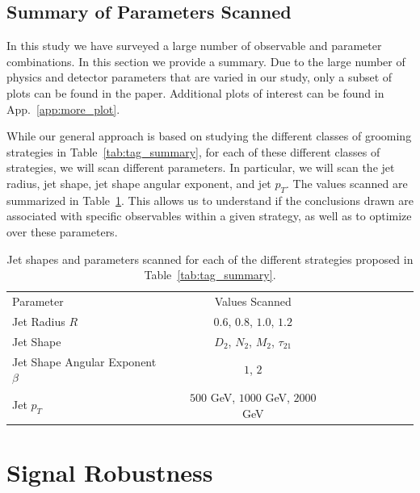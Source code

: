 \documentclass[11pt,letterpaper]{article}
\DeclareRobustCommand{\App}[1]{App.~\ref{#1}}
\DeclareRobustCommand{\Tab}[1]{Table~\ref{#1}}
\begin{document}
\subsection{Summary of Parameters Scanned}\label{sec:params}

In this study we have surveyed a large number of observable and parameter combinations. In this section we provide a summary. Due to the large number of physics and detector parameters that are varied in our study, only a subset of plots can be found in the paper. Additional plots of interest can be found in \App{app:more_plot}.

While our general approach is based on studying the different classes of grooming strategies in \Tab{tab:tag_summary}, for each of these different classes of strategies, we will scan different parameters. In particular, we will scan the jet radius, jet shape, jet shape angular exponent, and jet $p_T$. The values scanned are summarized in \Tab{tab:params}. This allows us to understand if the conclusions drawn are associated with specific observables within a given strategy, as well as to optimize over these parameters.



\begin{table}
\begin{center}
\begin{tabular}{| l | c | c |c |c|c|c |c|r| }
  \hline                       
  Parameter &  Values Scanned \\
  Jet Radius $R$ &   $0.6$, $0.8$, $1.0$, $1.2$  \\
  Jet Shape  &   $D_2$, $N_2$, $M_2$, $\tau_{21}$  \\
  Jet Shape Angular Exponent $\beta$ &   $1$, $2$ \\
  Jet $p_T$ &   $500$ GeV, $1000$ GeV, $2000$ GeV  \\
  \hline  
\end{tabular}
\end{center}
\caption{
Jet shapes and parameters scanned for each of the different strategies proposed in \Tab{tab:tag_summary}.
}
\label{tab:params}
\end{table}


\section{Signal Robustness}\label{sec:polar}
\end{document}
